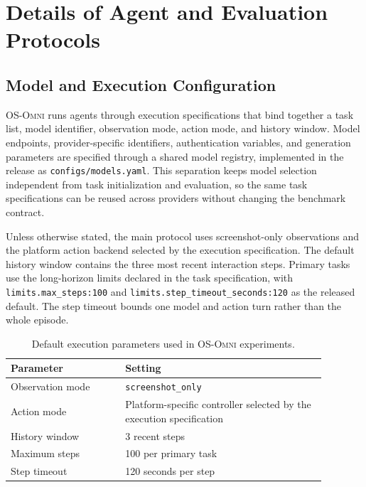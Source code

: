 \section{Details of Agent and Evaluation Protocols}

\subsection{Model and Execution Configuration}
\label{app:baseline_methods}
\textsc{OS-Omni} runs agents through execution specifications that bind together a task list, model identifier, observation mode, action mode, and history window. Model endpoints, provider-specific identifiers, authentication variables, and generation parameters are specified through a shared model registry, implemented in the release as \texttt{configs/models.yaml}. This separation keeps model selection independent from task initialization and evaluation, so the same task specifications can be reused across providers without changing the benchmark contract.

Unless otherwise stated, the main protocol uses screenshot-only observations and the platform action backend selected by the execution specification. The default history window contains the three most recent interaction steps. Primary tasks use the long-horizon limits declared in the task specification, with \texttt{limits.max\_steps:100} and \texttt{limits.step\_timeout\_seconds:120} as the released default. The step timeout bounds one model and action turn rather than the whole episode.

\begin{table}[ht]
\centering
\caption{Default execution parameters used in \textsc{OS-Omni} experiments.}
\label{tab:agent_execution_config}
\small
\begin{tabular}{p{0.32\linewidth}p{0.56\linewidth}}
\toprule
Parameter & Setting \\
\midrule
Observation mode & \texttt{screenshot\_only} \\
Action mode & Platform-specific controller selected by the execution specification \\
History window & 3 recent steps \\
Maximum steps & 100 per primary task \\
Step timeout & 120 seconds per step \\

\bottomrule
\end{tabular}
\end{table}



